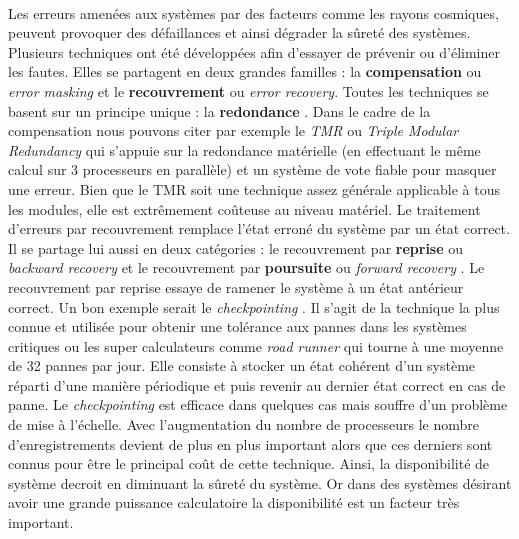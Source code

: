 \documentclass[a4paper, 10pt]{report}
\begin{document}
\paragraph*{} 
Les erreurs amenées aux systèmes par des facteurs comme les rayons cosmiques, peuvent provoquer des 
défaillances et ainsi dégrader la sûreté des systèmes.\newline
Plusieurs techniques ont été développées afin d'essayer de prévenir ou d'éliminer les fautes. Elles se partagent en deux 
grandes familles : la \textbf{compensation} ou \textit{error masking} et le \textbf{recouvrement}  ou  \textit{error 
recovery}. Toutes les techniques se basent sur un principe unique : la \textbf{ redondance }.\newline
Dans le cadre de la compensation nous pouvons citer par exemple le \textit{TMR} ou \textit{Triple Modular Redundancy} qui 
s’appuie sur la redondance matérielle (en effectuant le même calcul sur 3 processeurs en parallèle) et un système de vote 
fiable pour masquer une erreur. Bien que le TMR soit une technique assez générale applicable à tous les modules, elle 
est extrêmement coûteuse au niveau matériel.\newline
Le traitement d'erreurs par recouvrement remplace l'état erroné du système par un état correct. Il se partage lui aussi
en deux catégories : le recouvrement par \textbf{ reprise } ou \textit{ backward recovery } et le recouvrement par 
\textbf{ poursuite } ou \textit{ forward recovery }. Le recouvrement par reprise essaye de ramener le système à un état 
antérieur correct. Un bon exemple serait le \textit{ checkpointing }. Il s'agit de la technique la plus connue et 
utilisée pour obtenir une tolérance aux pannes dans les systèmes critiques ou les super calculateurs comme \textit{ road 
runner } qui tourne à une moyenne de 32 pannes par jour. Elle consiste à stocker un état cohérent d'un système réparti 
d'une manière périodique et puis revenir au dernier état correct en cas de panne. Le \textit{ checkpointing } est 
efficace dans quelques cas mais souffre d'un problème de mise à l'échelle. Avec l'augmentation du nombre de processeurs
le nombre d'enregistrements devient de plus en plus important alors que ces derniers sont connus pour être le principal 
coût de cette technique. Ainsi, la disponibilité de système decroit en diminuant la sûreté du système. Or dans des 
systèmes désirant avoir une grande puissance calculatoire la disponibilité est un facteur très important.
\end{document}
